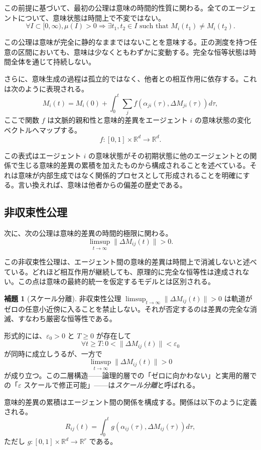 \documentclass[11pt,a4paper]{article}
\theoremstyle{definition}
\newtheorem{lemma}{補題}[section]
\begin{document}
この前提に基づいて、最初の公理は意味の時間的性質に関わる。全てのエージェントについて、意味状態は時間上で不変ではない。
\[
\forall I \subset [0,\infty), \mu(I) > 0 \Rightarrow \exists t_1, t_2 \in I \text{ such that } M_i(t_1) \neq M_i(t_2).
\]

この公理は意味が完全に静的なままではないことを意味する。正の測度を持つ任意の区間においても、意味は少なくともわずかに変動する。完全な恒等状態は時間全体を通じて持続しない。

さらに、意味生成の過程は孤立的ではなく、他者との相互作用に依存する。これは次のように表現される。
\[
M_i(t) = M_i(0) + \int_0^t \sum_j f(\alpha_{ji}(\tau), \Delta M_{ji}(\tau)) d\tau,
\]
ここで関数 $f$ は文脈的親和性と意味的差異をエージェント $i$ の意味状態の変化ベクトルへマップする。
\[
f : [0, 1] \times \mathbb{R}^d \to \mathbb{R}^d.
\]

この表式はエージェント $i$ の意味状態がその初期状態に他のエージェントとの関係で生じる意味的差異の累積を加えたものから構成されることを述べている。それは意味が内部生成ではなく関係的プロセスとして形成されることを明確にする。言い換えれば、意味は他者からの偏差の歴史である。

\subsection{非収束性公理}

次に、次の公理は意味的差異の時間的極限に関わる。
\[
\limsup_{t \to \infty} \|\Delta M_{ij}(t)\| > 0.
\]

この非収束性公理は、エージェント間の意味的差異は時間上で消滅しないと述べている。どれほど相互作用が継続しても、原理的に完全な恒等性は達成されない。この点は意味の最終的統一を仮定するモデルとは区別される。

\begin{lemma}[スケール分離]
非収束性公理 $\limsup_{t \to \infty} \|\Delta M_{ij}(t)\| > 0$ は軌道がゼロの任意小近傍に入ることを禁止しない。それが否定するのは差異の完全な消滅、すなわち厳密な恒等性である。

形式的には、$\varepsilon_0 > 0$ と $T \geq 0$ が存在して
\[
\forall t \geq T: 0 < \|\Delta M_{ij}(t)\| < \varepsilon_0
\]
が同時に成立しうるが、一方で
\[
\limsup_{t \to \infty} \|\Delta M_{ij}(t)\| > 0
\]
が成り立つ。この二層構造——論理的層での「ゼロに向かわない」と実用的層での「$\varepsilon$ スケールで修正可能」——は\textit{スケール分離}と呼ばれる。
\end{lemma}

意味的差異の累積はエージェント間の関係を構成する。関係は以下のように定義される。
\[
R_{ij}(t) = \int_0^t g(\alpha_{ij}(\tau), \Delta M_{ij}(\tau)) d\tau,
\]
ただし $g : [0, 1] \times \mathbb{R}^d \to \mathbb{R}^r$ である。
\end{document}
